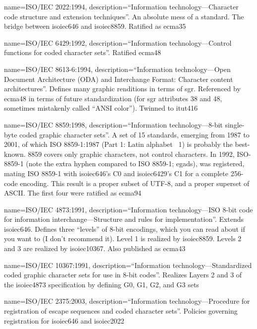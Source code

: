 {
  name={ISO/IEC 2022:1994},
  description={``Information technology---Character code structure and extension techniques''.
   An absolute mess of a standard. The bridge between \Gls{isoiec646} and \Gls{isoiec8859}.
   Ratified as \Gls{ecma35}}
}

{
  name={ISO/IEC 6429:1992},
  description={``Information technology---Control functions for coded character sets''.
   Ratified \Gls{ecma48}}
}

{
  name={ISO/IEC 8613-6:1994},
  description={``Information technology---Open Document Architecture (ODA) and Interchange Format: Character content architectures''.
    Defines many graphic renditions in terms of \Gls{sgr}. Referenced by \Gls{ecma48} in terms
    of future standardization (for \Gls{sgr} attributes 38 and 48, sometimes
    mistakenly called ``ANSI color''). Twinned to \Gls{itut416}}
}

{
  name={ISO/IEC 8859:1998},
  description={``Information technology---8-bit single-byte coded graphic character sets''.
    A set of 15 standards, emerging from 1987 to 2001, of which ISO 8859-1:1987 (Part 1: Latin alphabet \textnumero\ 1) is
    probably the best-known. 8859 covers only graphic characters, not control
    characters. In 1992, ISO-8859-1 (note the extra hyphen compared to ISO 8859-1; egads),
    was registered, mating ISO 8859-1 with \Gls{isoiec646}'s \Gls{C0} and
    \Gls{isoiec6429}'s C1 for a complete 256-code encoding. This result is a
    proper subset of UTF-8, and a proper superset of ASCII. The first four were
    ratified as \Gls{ecma94}}
}

{
  name={ISO/IEC 4873:1991},
  description={``Information technology---ISO 8-bit code for information interchange---Structure and rules for implementation''.
    Extends \Gls{isoiec646}. Defines three ``levels'' of 8-bit encodings, which
    you can read about if you want to (I don't recommend it). Level 1 is
    realized by \Gls{isoiec8859}. Levels 2 and 3 are realized by \Gls{isoiec10367}.
    Also published as \Gls{ecma43}}
}

{
  name={ISO/IEC 10367:1991},
  description={``Information technology---Standardized coded graphic character sets for use in 8-bit codes''.
    Realizes Layers 2 and 3 of the \Gls{isoiec4873} specification by defining
    G0, G1, G2, and G3 sets}
}

{
  name={ISO/IEC 2375:2003},
  description={``Information technology---Procedure for registration of escape sequences and coded character sets''.
   Policies governing registration for \Gls{isoiec646} and \Gls{isoiec2022}}
}

